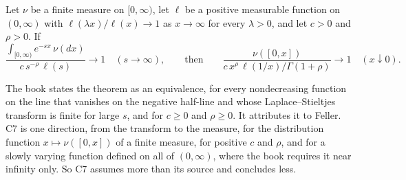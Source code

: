 \begin{theorem}\label{thm:cited-A11}
Let $\nu$ be a finite measure on $[0,\infty)$, let $\ell$ be a positive measurable function on
$(0,\infty)$ with $\ell(\lambda x)/\ell(x) \to 1$ as $x \to \infty$ for every $\lambda > 0$, and
let $c > 0$ and $\rho > 0$. If
\[
  \frac{\int_{[0,\infty)} e^{-sx}\,\nu(dx)}{c\,s^{-\rho}\,\ell(s)} \to 1 \quad (s \to \infty),
  \qquad\text{then}\qquad
  \frac{\nu([0,x])}{c\,x^{\rho}\,\ell(1/x)/\Gamma(1+\rho)} \to 1 \quad (x \downarrow 0) .
\]
\end{theorem}

The book states the theorem as an equivalence, for every nondecreasing function on the line that
vanishes on the negative half-line and whose Laplace--Stieltjes transform is finite for large $s$,
and for $c \ge 0$ and $\rho \ge 0$. It attributes it to Feller. C7 is one direction, from the
transform to the measure, for the distribution function $x \mapsto \nu([0,x])$ of a finite
measure, for positive $c$ and $\rho$, and for a slowly varying function defined on all of
$(0,\infty)$, where the book requires it near infinity only. So C7 assumes more than its source and
concludes less.
